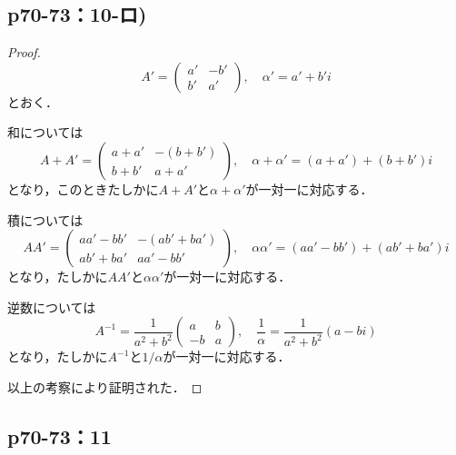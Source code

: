\documentclass[uplatex,dvipdfmx,a4paper,10pt,fleqn]{jsarticle}
\begin{document}
\newpage 


\subsection*{p70-73：10-ロ)}

\begin{tleftbar}
    \begin{proof}
    \[
        A' = \begin{pmatrix} a' & -b' \\ b' & a' \end{pmatrix} , \quad \alpha ' = a' + b' i
    \]
    とおく．

    和については
    \[
        A+A' = \begin{pmatrix} a+a' & -(b+b') \\ b+b' & a+a' \end{pmatrix} , \quad \alpha + \alpha ' = (a+a') + (b+b') i
    \]
    となり，このときたしかに$A+A'$と$\alpha + \alpha '$が一対一に対応する．

    積については
    \[
        A A' = \begin{pmatrix} a a' - b b' & - (a b' + b a') \\ a b' + b a' & a a' - b b' \end{pmatrix} , \quad \alpha \alpha ' = (a a' - b b') + (a b' + b a') i
    \]
    となり，たしかに$AA'$と$\alpha \alpha '$が一対一に対応する．

    逆数については
    \[
        A^{-1} = \frac{1}{a^2+b^2} \begin{pmatrix} a & b \\ -b & a \end{pmatrix},\quad \frac{1}{\alpha} = \frac{1}{a^2+b^2}(a -bi )
    \]
    となり，たしかに$A^{-1}$と$1/\alpha$が一対一に対応する．

    以上の考察により証明された．
    \end{proof}
\end{tleftbar}

\newpage 

\subsection*{p70-73：11}
\end{document}
